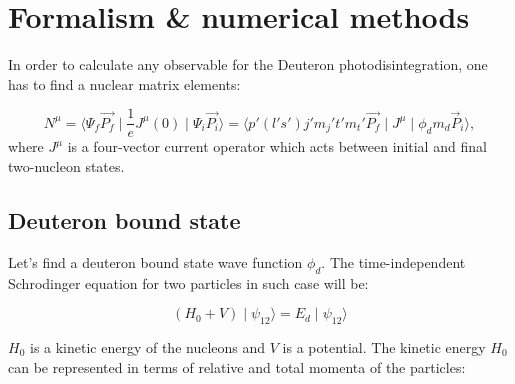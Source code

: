 \chapter{Formalism \& numerical methods}


In order to calculate any observable for the Deuteron photodisintegration,
one has to find a nuclear matrix elements:

\begin{equation}
    N^\mu = \langle \Psi_f \vec{P_f} \mid \frac{1}{e}J^\mu(0) \mid \Psi_i \vec{P_i} \rangle =
    \langle p' (l's')j'm_j't'm_t' \vec{P_f} \mid J^\mu \mid \phi_d m_d \vec{P}_i \rangle, 
    \label{main}
\end{equation}
where $J^\mu$ is a four-vector current operator which acts between initial and final 
two-nucleon states. 



\section{Deuteron bound state}
    \label{sec:deut_bound}

    Let's find a deuteron bound state wave function $\phi_d$. The time-independent Schrodinger
    equation for two particles in such case will be:

    \begin{equation}
        (H_0 + V) \mid \psi_{12} \rangle  = E_d \mid \psi_{12} \rangle
        \label{shrod_bound}
    \end{equation}

    $H_0$ is a kinetic energy of the nucleons and $V$ is a potential. 
    The kinetic energy $H_0$ can be represented in terms of  relative and total momenta
    of the particles:

